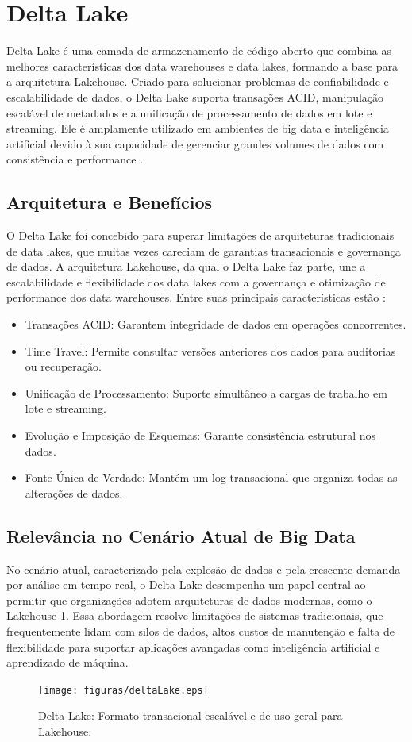 \section{Delta Lake}
Delta Lake é uma camada de armazenamento de código aberto que combina as melhores características dos data warehouses e data lakes, 
formando a base para a arquitetura Lakehouse. Criado para solucionar problemas de confiabilidade e escalabilidade de dados, o Delta 
Lake suporta transações ACID, manipulação escalável de metadados e a unificação de processamento de dados em lote e streaming. Ele 
é amplamente utilizado em ambientes de big data e inteligência artificial devido à sua capacidade de gerenciar grandes volumes de 
dados com consistência e performance \cite{lee2024delta}. 

\subsection{Arquitetura e Benefícios}
O Delta Lake foi concebido para superar limitações de arquiteturas tradicionais de data lakes, que muitas vezes careciam de garantias transacionais e governança de dados. A arquitetura Lakehouse, da qual o Delta Lake faz parte, une a escalabilidade e flexibilidade dos data lakes com a governança e otimização de performance dos data warehouses. Entre suas principais características estão \cite{lee2024delta}:
\begin{itemize}
    \item Transações ACID: Garantem integridade de dados em operações concorrentes.
    \item Time Travel: Permite consultar versões anteriores dos dados para auditorias ou recuperação.
    \item Unificação de Processamento: Suporte simultâneo a cargas de trabalho em lote e streaming.
    \item Evolução e Imposição de Esquemas: Garante consistência estrutural nos dados.
    \item Fonte Única de Verdade: Mantém um log transacional que organiza todas as alterações de dados.
\end{itemize}

\subsection{Relevância no Cenário Atual de Big Data}
No cenário atual, caracterizado pela explosão de dados e pela crescente demanda por análise em tempo real, o Delta Lake desempenha 
um papel central ao permitir que organizações adotem arquiteturas de dados modernas, como o Lakehouse \ref{fig:pipeline_proc}. Essa abordagem resolve limitações 
de sistemas tradicionais, que frequentemente lidam com silos de dados, altos custos de manutenção e falta de flexibilidade para suportar 
aplicações avançadas como inteligência artificial e aprendizado de máquina.

\begin{figure}[h]
    \centering
    \texttt{[image: figuras/deltaLake.eps]}
    \caption{Delta Lake: Formato transacional escalável e de uso geral para Lakehouse. \cite{lee2024delta}}
    \label{fig:pipeline_proc}
\end{figure}